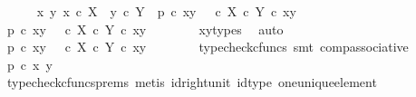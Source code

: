 \begin{isabellebody}
\ \ \ \ \isamarkupfalse%
\ {\isachardoublequoteopen}{\isasymAnd}x\ y{\isachardot}{\kern0pt}\ x\ {\isasymin}\isactrlsub c\ X\ {\isasymLongrightarrow}\ y\ {\isasymin}\isactrlsub c\ Y\ {\isasymLongrightarrow}\ p\ {\isasymcirc}\isactrlsub c\ {\isasymlangle}x{\isacharcomma}{\kern0pt}y{\isasymrangle}\ {\isacharequal}{\kern0pt}\ {\isacharparenleft}{\kern0pt}{\isasymt}\ {\isasymcirc}\isactrlsub c\ {\isasymbeta}\isactrlbsub X\ {\isasymtimes}\isactrlsub c\ Y\isactrlesub {\isacharparenright}{\kern0pt}\ {\isasymcirc}\isactrlsub c\ {\isasymlangle}x{\isacharcomma}{\kern0pt}y{\isasymrangle}{\isachardoublequoteclose}\isanewline
\ \ \ \ \isamarkupfalse%
\ \isamarkupfalse%
\ {\isachardoublequoteopen}p\ {\isasymcirc}\isactrlsub c\ {\isasymlangle}x{\isacharcomma}{\kern0pt}y{\isasymrangle}\ {\isacharequal}{\kern0pt}\ {\isacharparenleft}{\kern0pt}{\isasymt}\ {\isasymcirc}\isactrlsub c\ {\isasymbeta}\isactrlbsub X\ {\isasymtimes}\isactrlsub c\ Y\isactrlesub {\isacharparenright}{\kern0pt}\ {\isasymcirc}\isactrlsub c\ {\isasymlangle}x{\isacharcomma}{\kern0pt}y{\isasymrangle}{\isachardoublequoteclose}\isanewline
\ \ \ \ \ \ \isamarkupfalse%
\ xy{\isacharunderscore}{\kern0pt}types\ \isamarkupfalse%
\ auto\isanewline
\ \ \ \ \isamarkupfalse%
\ \isamarkupfalse%
\ {\isachardoublequoteopen}p\ {\isasymcirc}\isactrlsub c\ {\isasymlangle}x{\isacharcomma}{\kern0pt}y{\isasymrangle}\ {\isacharequal}{\kern0pt}\ {\isasymt}\ {\isasymcirc}\isactrlsub c\ {\isacharparenleft}{\kern0pt}{\isasymbeta}\isactrlbsub X\ {\isasymtimes}\isactrlsub c\ Y\isactrlesub \ {\isasymcirc}\isactrlsub c\ {\isasymlangle}x{\isacharcomma}{\kern0pt}y{\isasymrangle}{\isacharparenright}{\kern0pt}{\isachardoublequoteclose}\isanewline
\ \ \ \ \ \ \isamarkupfalse%
\ {\isacharparenleft}{\kern0pt}typecheck{\isacharunderscore}{\kern0pt}cfuncs{\isacharcomma}{\kern0pt}\ smt\ comp{\isacharunderscore}{\kern0pt}associative{}{\isacharparenright}{\kern0pt}\isanewline
\ \ \ \ \isamarkupfalse%
\ \isamarkupfalse%
\ {\isachardoublequoteopen}p\ {\isasymcirc}\isactrlsub c\ {\isasymlangle}x{\isacharcomma}{\kern0pt}\ y{\isasymrangle}\ {\isacharequal}{\kern0pt}\ {\isasymt}{\isachardoublequoteclose}\isanewline
\ \ \ \ \ \ \isamarkupfalse%
\ {\isacharparenleft}{\kern0pt}typecheck{\isacharunderscore}{\kern0pt}cfuncs{\isacharunderscore}{\kern0pt}prems{\isacharcomma}{\kern0pt}\ metis\ id{\isacharunderscore}{\kern0pt}right{\isacharunderscore}{\kern0pt}unit{}\ id{\isacharunderscore}{\kern0pt}type\ one{\isacharunderscore}{\kern0pt}unique{\isacharunderscore}{\kern0pt}element{\isacharparenright}{\kern0pt}\isanewline

\end{isabellebody}
